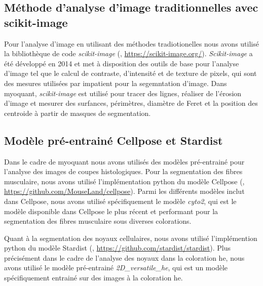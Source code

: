 \subsection{Méthode d'analyse d'image traditionnelles avec scikit-image}
Pour l'analyse d'image en utilisant des méthodes tradiotionelles nous avons utilisé la bibliothèque de code \textit{scikit-image} (\cite{walt_scikit-image_2014}, \href{https://scikit-image.org/}{https://scikit-image.org/}). \textit{Scikit-image} a été développé en 2014 et met à disposition des outils de base pour l'analyse d'image tel que le calcul de contraste, d'intensité et de texture de pixels, qui sont des mesures utilisées par \gls{impatient} pour la segemntation d'image. Dans \gls{myoquant}, \textit{scikit-image} est utilisé pour tracer des lignes, réaliser de l'érosion d'image et mesurer des surfances, périmètres, diamètre de Feret et la position des centroide à partir de masques de segmentation.

\subsection{Modèle pré-entrainé Cellpose et Stardist}
Dans le cadre de \gls{myoquant} nous avons utilisés des modèles pré-entrainé pour l'analyse des images de coupes histologiques. Pour la segmentation des fibres musculaire, nous avons utilisé l'implémentation python du modèle Cellpose (\cite{stringer_cellpose_2021}, \href{https://github.com/MouseLand/cellpose}{https://github.com/MouseLand/cellpose}). Parmi les différents modèles inclut dans Cellpose, nous avons utilisé spécifiquement le modèle \textit{cyto2}, qui est le modèle disponible dans Cellpose le plus récent et performant pour la segmentation des fibres musculaire sous diverses colorations. 

Quant à la segmentation des noyaux cellulaires, nous avons utilisé l'implémention python du modèle Stardist (\cite{weigert_star-convex_2020}, \href{https://github.com/stardist/stardist}{https://github.com/stardist/stardist}). Plus précisément dans le cadre de l'analyse des noyaux dans la coloration \gls{he}, nous avons utilisé le modèle pré-entrainé \textit{2D\_versatile\_he}, qui est un modèle spécifiquement entrainé sur des images à la coloration \gls{he}.

